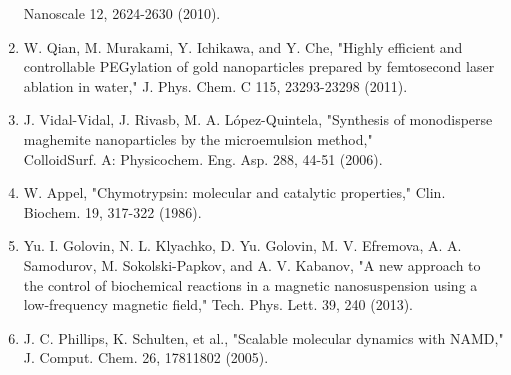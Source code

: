 \documentclass[10pt, a4paper]{article}
\begin{document}
\begin{enumerate}
  Nanoscale 12, 2624-2630 (2010).
  \item W. Qian, M. Murakami, Y. Ichikawa, and Y. Che, "Highly efficient and controllable PEGylation of gold nanoparticles prepared by femtosecond laser ablation in water," J. Phys. Chem. C 115, 23293-23298 (2011).
  \item J. Vidal-Vidal, J. Rivasb, M. A. López-Quintela, "Synthesis of monodisperse maghemite nanoparticles by the microemulsion method," \\
  ColloidSurf. A: Physicochem. Eng. Asp. 288, 44-51 (2006).
  \item W. Appel, "Chymotrypsin: molecular and catalytic properties," Clin. Biochem. 19, 317-322 (1986).
  \item Yu. I. Golovin, N. L. Klyachko, D. Yu. Golovin, M. V. Efremova, A. A. Samodurov, M. Sokolski-Papkov, and A. V. Kabanov, "A new approach to the control of biochemical reactions in a magnetic nanosuspension using a low-frequency magnetic field," Tech. Phys. Lett. 39, 240 (2013).
  \item J. C. Phillips, K. Schulten, et al., "Scalable molecular dynamics with NAMD," J. Comput. Chem. 26, 17811802 (2005).
\end{enumerate}
\end{document}
